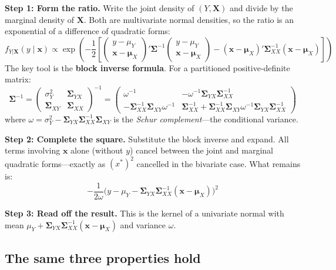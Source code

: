 \documentclass[11pt]{article}
\begin{document}
\medskip\noindent
\textbf{Step 1: Form the ratio.}  Write the joint density of $(Y, \bm{X})$ and divide by the marginal density of $\bm{X}$.  Both are multivariate normal densities, so the ratio is an exponential of a difference of quadratic forms:
\[
f_{Y|\bm{X}}(y\mid \bm{x}) \propto
\exp\!\left(
-\frac{1}{2}\left[
\begin{pmatrix} y - \mu_Y \\ \bm{x}-\bm{\mu}_X \end{pmatrix}' \bm{\Sigma}^{-1}
\begin{pmatrix} y - \mu_Y \\ \bm{x}-\bm{\mu}_X \end{pmatrix}
- (\bm{x}-\bm{\mu}_X)'\bm{\Sigma}_{XX}^{-1}(\bm{x}-\bm{\mu}_X)
\right]
\right)
\]
The key tool is the \textbf{block inverse formula}.  For a partitioned positive-definite matrix:
\[
\bm{\Sigma}^{-1} =
\begin{pmatrix} \sigma_Y^2 & \bm{\Sigma}_{YX} \\ \bm{\Sigma}_{XY} & \bm{\Sigma}_{XX} \end{pmatrix}^{-1}
= \begin{pmatrix} \omega^{-1} & -\omega^{-1}\bm{\Sigma}_{YX}\bm{\Sigma}_{XX}^{-1} \\
-\bm{\Sigma}_{XX}^{-1}\bm{\Sigma}_{XY}\omega^{-1} & \bm{\Sigma}_{XX}^{-1}+\bm{\Sigma}_{XX}^{-1}\bm{\Sigma}_{XY}\omega^{-1}\bm{\Sigma}_{YX}\bm{\Sigma}_{XX}^{-1} \end{pmatrix}
\]
where $\omega = \sigma_Y^2 - \bm{\Sigma}_{YX}\bm{\Sigma}_{XX}^{-1}\bm{\Sigma}_{XY}$ is the \emph{Schur complement}---the conditional variance.

\medskip\noindent
\textbf{Step 2: Complete the square.}  Substitute the block inverse and expand.  All terms involving $\bm{x}$ alone (without $y$) cancel between the joint and marginal quadratic forms---exactly as $(x^*)^2$ cancelled in the bivariate case.  What remains is:
\[
-\frac{1}{2\omega}\Big(y - \mu_Y - \bm{\Sigma}_{YX}\bm{\Sigma}_{XX}^{-1}(\bm{x}-\bm{\mu}_X)\Big)^2
\]

\medskip\noindent
\textbf{Step 3: Read off the result.}  This is the kernel of a univariate normal with mean $\mu_Y + \bm{\Sigma}_{YX}\bm{\Sigma}_{XX}^{-1}(\bm{x}-\bm{\mu}_X)$ and variance $\omega$.

\subsection{The same three properties hold}
\end{document}
